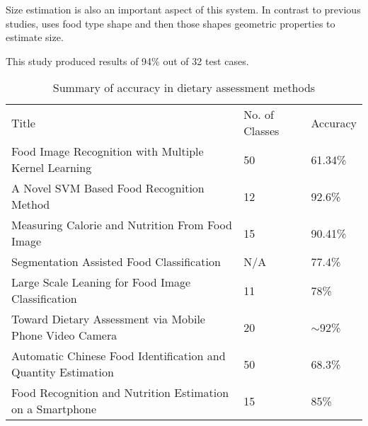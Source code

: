 Size estimation is also an important aspect of this system.
In contrast to previous studies, \textcite{snap} uses food type shape and then those shapes geometric properties to estimate size.

This study produced results of 94\% out of 32 test cases.


\begin{table}[]
\centering
\caption{Summary of accuracy in dietary assessment methods}
\label{other_dietary_summary}
\begin{tabular}{lll}
Title                                                         & No. of Classes & Accuracy   \\
Food Image Recognition with Multiple Kernel Learning          & 50             & 61.34\%    \\
A Novel SVM Based Food Recognition Method                     & 12             & 92.6\%     \\
Measuring Calorie and Nutrition From Food Image               & 15             & 90.41\%    \\
Segmentation Assisted Food Classification                     & N/A            & 77.4\%     \\
Large Scale Leaning for Food Image Classification             & 11             & 78\%       \\
Toward Dietary Assessment via Mobile Phone Video Camera       & 20             & $\sim$92\% \\
Automatic Chinese Food Identification and Quantity Estimation & 50             & 68.3\%     \\
Food Recognition and Nutrition Estimation on a Smartphone      & 15             & 85\%      
\end{tabular}
\end{table}